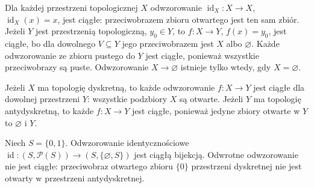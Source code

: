 \begin{przyklad}
\label{ex:topog-ciaglosc-elementarna}
Dla każdej przestrzeni topologicznej $X$ odwzorowanie
$\operatorname{id}_X\colon X\to X$, $\operatorname{id}_X(x)=x$,
jest ciągłe: przeciwobrazem zbioru otwartego jest ten sam zbiór.
Jeżeli $Y$ jest przestrzenią topologiczną, $y_0\in Y$, to
$f\colon X\to Y$, $f(x)=y_0$, jest ciągłe, bo dla dowolnego
$V\subseteq Y$ jego przeciwobrazem jest $X$ albo $\varnothing$.
Każde odwzorowanie ze zbioru pustego do $Y$ jest ciągłe,
ponieważ wszystkie przeciwobrazy są puste. Odwzorowanie
$X\to\varnothing$ istnieje tylko wtedy, gdy $X=\varnothing$.
\end{przyklad}

\begin{przyklad}
\label{ex:topog-ciaglosc-skrajne}
Jeżeli $X$ ma topologię dyskretną, to każde odwzorowanie
$f\colon X\to Y$ jest ciągłe dla dowolnej przestrzeni $Y$:
wszystkie podzbiory $X$ są otwarte.
Jeżeli $Y$ ma topologię antydyskretną, to każde
$f\colon X\to Y$ jest ciągłe, ponieważ jedyne zbiory otwarte
w $Y$ to $\varnothing$ i $Y$.

Niech $S=\{0,1\}$. Odwzorowanie identycznościowe
$\operatorname{id}\colon(S,\mathcal P(S))\to
(S,\{\varnothing,S\})$ jest ciągłą bijekcją. Odwrotne
odwzorowanie nie jest ciągłe: przeciwobraz otwartego zbioru
$\{0\}$ przestrzeni dyskretnej nie jest otwarty w przestrzeni
antydyskretnej.
\end{przyklad}

